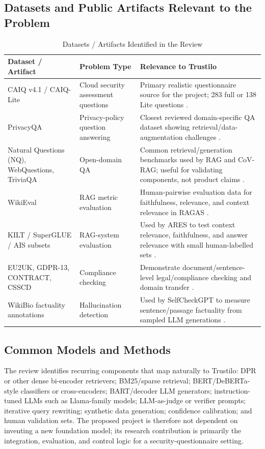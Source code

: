 \documentclass[11pt,journal,onecolumn]{IEEEtran}
\begin{document}
\subsection{Datasets and Public Artifacts Relevant to the Problem}
\begin{table}[H]
\centering
\caption{Datasets / Artifacts Identified in the Review}
\small
\begin{tabularx}{\textwidth}{L{0.23\textwidth}L{0.23\textwidth}Y}
\toprule
\textbf{Dataset / Artifact} & \textbf{Problem Type} & \textbf{Relevance to Trustilo} \\
\midrule
CAIQ v4.1 / CAIQ-Lite & Cloud security assessment questions & Primary realistic questionnaire source for the project; 283 full or 138 Lite questions \cite{csa2026guide,csa2026lite}. \\
PrivacyQA & Privacy-policy question answering & Closest reviewed domain-specific QA dataset showing retrieval/data-augmentation challenges \cite{parvez2023privacyqa}. \\
Natural Questions (NQ), WebQuestions, TriviaQA & Open-domain QA & Common retrieval/generation benchmarks used by RAG and CoV-RAG; useful for validating components, not product claims \cite{lewis2020rag,he2024covrag}. \\
WikiEval & RAG metric evaluation & Human-pairwise evaluation data for faithfulness, relevance, and context relevance in RAGAS \cite{es2024ragas}. \\
KILT / SuperGLUE / AIS subsets & RAG-system evaluation & Used by ARES to test context relevance, faithfulness, and answer relevance with small human-labelled sets \cite{saadfalcon2024ares}. \\
EU2UK, GDPR-13, CONTRACT, CSSCD & Compliance checking & Demonstrate document/sentence-level legal/compliance checking and domain transfer \cite{sun2025compliance}. \\
WikiBio factuality annotations & Hallucination detection & Used by SelfCheckGPT to measure sentence/passage factuality from sampled LLM generations \cite{manakul2023selfcheckgpt}. \\
\bottomrule
\end{tabularx}
\end{table}

\subsection{Common Models and Methods}
The review identifies recurring components that map naturally to Trustilo: DPR or other dense bi-encoder retrievers; BM25/sparse retrieval; BERT/DeBERTa-style classifiers or cross-encoders; BART/decoder LLM generators; instruction-tuned LLMs such as Llama-family models; LLM-as-judge or verifier prompts; iterative query rewriting; synthetic data generation; confidence calibration; and human validation sets. The proposed project is therefore not dependent on inventing a new foundation model; its research contribution is primarily the integration, evaluation, and control logic for a security-questionnaire setting.
\end{document}
